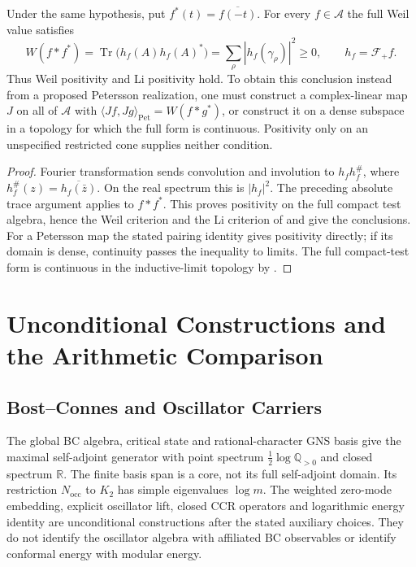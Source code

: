 \begin{corollary}
\label{v4-arith:w5-b:cor:weil-positive}
Under the same hypothesis, put $f^*(t)=\overline{f(-t)}$.
For every $f\in\mathcal A$ the full Weil value satisfies
\[
 W(f*f^*)=\operatorname{Tr}\bigl(h_f(A)h_f(A)^*\bigr)
           =\sum_\rho|h_f(\gamma_\rho)|^2\geq0,
 \qquad h_f=\mathcal F_+f.
\]
Thus Weil positivity and Li positivity hold.
To obtain this conclusion instead from a proposed Petersson
realization, one must construct a complex-linear map $J$ on all
of $\mathcal A$ with
$\langle Jf,Jg\rangle_{\mathrm{Pet}}=W(f*g^*)$, or construct it on
a dense subspace in a topology for which the full form is
continuous. Positivity only on an unspecified restricted cone
supplies neither condition.
\end{corollary}
\begin{proof}
Fourier transformation sends convolution and involution to
$h_fh_f^\#$, where $h_f^\#(z)=\overline{h_f(\bar z)}$.
On the real spectrum this is $|h_f|^2$. The preceding absolute
trace argument applies to $f*f^*$. This proves positivity on the
full compact test algebra, hence the Weil criterion and the Li
criterion of  and
 give the conclusions.
For a Petersson map the stated pairing identity gives positivity
directly; if its domain is dense, continuity passes the inequality
to limits. The full compact-test form is continuous in the
inductive-limit topology by .
\end{proof}

\section{Unconditional Constructions and the Arithmetic Comparison}
\label{v4-arith:w5-b:form}

\subsection{Bost--Connes and Oscillator Carriers}
\label{v4-arith:w5-b:form:layer-1}

The global BC algebra, critical state and rational-character GNS
basis give the maximal self-adjoint generator with point spectrum
$\tfrac12\log\mathbb Q_{>0}$ and closed spectrum $\mathbb R$.
The finite basis span is a core, not its full self-adjoint domain.
Its restriction $N_{\mathrm{occ}}$ to $K_2$ has simple eigenvalues
$\log m$. The weighted zero-mode embedding, explicit oscillator
lift, closed CCR operators and logarithmic energy identity are
unconditional constructions after the stated auxiliary choices.
They do not identify the oscillator algebra with affiliated BC
observables or identify conformal energy with modular energy.

